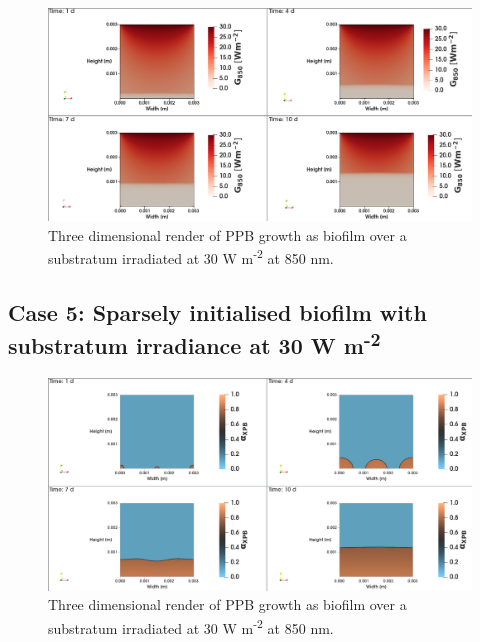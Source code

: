\begin{figure}[H]
    \centering
    \includegraphics[width=\textwidth,height=0.4\textheight]{Chap4/results/post_processing/2D_cases/case4_rad.png}
    \caption{Three dimensional render of PPB growth as biofilm over a substratum irradiated at 30 W m\textsuperscript{-2} at 850 nm. } 
    \label{fig:case5_3D_rad}
\end{figure}

\subsection{Case 5: Sparsely initialised biofilm with substratum irradiance at 30 W m\textsuperscript{-2}}
\begin{figure}[H]
    \centering
    \includegraphics[width=\textwidth,height=0.4\textheight]{Chap4/results/post_processing/2D_cases/case5_ppb.png}
    \caption{Three dimensional render of PPB growth as biofilm over a substratum irradiated at 30 W m\textsuperscript{-2} at 850 nm. } 
    \label{fig:case5_3D_rad}
\end{figure}

